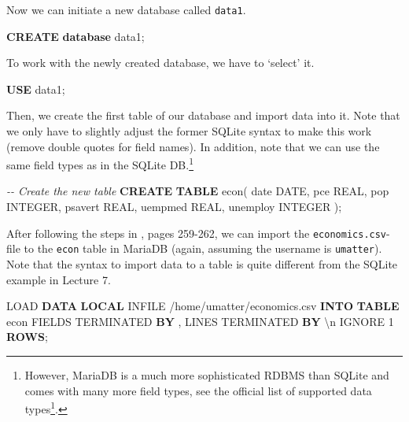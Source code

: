 \documentclass[
  12pt,
]{style/krantz}
\newenvironment{Shaded}{\begin{snugshade}}{\end{snugshade}}
\newcommand{\CharTok}[1]{\textcolor[rgb]{0.31,0.60,0.02}{#1}}
\newcommand{\CommentTok}[1]{\textcolor[rgb]{0.56,0.35,0.01}{\textit{#1}}}
\newcommand{\DataTypeTok}[1]{\textcolor[rgb]{0.13,0.29,0.53}{#1}}
\newcommand{\DecValTok}[1]{\textcolor[rgb]{0.00,0.00,0.81}{#1}}
\newcommand{\KeywordTok}[1]{\textcolor[rgb]{0.13,0.29,0.53}{\textbf{#1}}}
\newcommand{\NormalTok}[1]{#1}
\newcommand{\StringTok}[1]{\textcolor[rgb]{0.31,0.60,0.02}{#1}}
\renewcommand{\href}[2]{#2\footnote{\url{#1}}}
\begin{document}
Now we can initiate a new database called \texttt{data1}.

\begin{Shaded}
\begin{Highlighting}[]
\KeywordTok{CREATE} \KeywordTok{database}\NormalTok{ data1;}
\end{Highlighting}
\end{Shaded}

To work with the newly created database, we have to `select' it.

\begin{Shaded}
\begin{Highlighting}[]
\KeywordTok{USE}\NormalTok{ data1;}
\end{Highlighting}
\end{Shaded}

Then, we create the first table of our database and import data into it. Note that we only have to slightly adjust the former SQLite syntax to make this work (remove double quotes for field names). In addition, note that we can use the same field types as in the SQLite DB.\footnote{However, MariaDB is a much more sophisticated RDBMS than SQLite and comes with many more field types, see the official \href{https://mariadb.com/kb/en/library/data-types/}{list of supported data types}.}

\begin{Shaded}
\begin{Highlighting}[]
\CommentTok{{-}{-} Create the new table}
\KeywordTok{CREATE} \KeywordTok{TABLE}\NormalTok{ econ(}
\DataTypeTok{date} \DataTypeTok{DATE}\NormalTok{,}
\NormalTok{pce }\DataTypeTok{REAL}\NormalTok{,}
\NormalTok{pop }\DataTypeTok{INTEGER}\NormalTok{,}
\NormalTok{psavert }\DataTypeTok{REAL}\NormalTok{,}
\NormalTok{uempmed }\DataTypeTok{REAL}\NormalTok{,}
\NormalTok{unemploy }\DataTypeTok{INTEGER}
\NormalTok{);}
\end{Highlighting}
\end{Shaded}

After following the steps in \citet{walkowiak_2016}, pages 259-262, we can import the \texttt{economics.csv}-file to the \texttt{econ} table in MariaDB (again, assuming the username is \texttt{umatter}). Note that the syntax to import data to a table is quite different from the SQLite example in Lecture 7.

\begin{Shaded}
\begin{Highlighting}[]
\NormalTok{LOAD }\KeywordTok{DATA} \KeywordTok{LOCAL}\NormalTok{ INFILE}
\StringTok{\textquotesingle{}/home/umatter/economics.csv\textquotesingle{}} 
\KeywordTok{INTO} \KeywordTok{TABLE}\NormalTok{ econ}
\NormalTok{FIELDS TERMINATED }\KeywordTok{BY} \StringTok{\textquotesingle{},\textquotesingle{}}
\NormalTok{LINES TERMINATED }\KeywordTok{BY} \StringTok{\textquotesingle{}}\CharTok{\textbackslash{}n}\StringTok{\textquotesingle{}}
\NormalTok{IGNORE }\DecValTok{1} \KeywordTok{ROWS}\NormalTok{;}
\end{Highlighting}
\end{Shaded}
\end{document}
